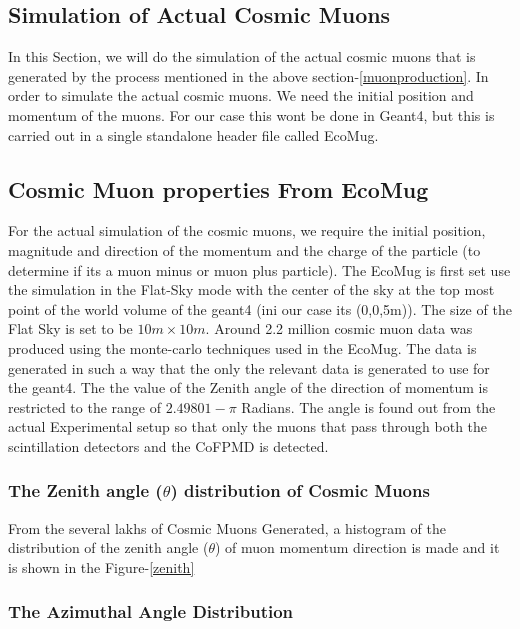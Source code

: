 \documentclass{article}
\begin{document}
\begin{multicols}{2}
\section{Simulation of Actual Cosmic Muons}

In this Section, we will do the simulation of the actual cosmic muons that is generated
by the process mentioned in the above section-\ref{muonproduction}. In order to 
simulate the actual cosmic muons. We need the initial position and momentum of the
muons. For our case this wont be done in Geant4, but this is carried out in a 
single standalone header file called EcoMug.


\subsection{Cosmic Muon properties From EcoMug}

For the actual simulation of the cosmic muons, we require the initial position,
magnitude and direction of the momentum and the charge of the particle (to determine if 
its a muon minus or muon plus particle). The EcoMug is first set use the
simulation in the Flat-Sky mode with the center of the sky at the top
most point of the world volume of the geant4 (ini our case its (0,0,5m)).
The size of the Flat Sky is set to be $10m \times 10m $. Around 2.2 million
cosmic muon data was produced using the monte-carlo techniques used in the 
EcoMug. The data is generated in such a way that the only the relevant 
data is generated to use for the geant4. The the value of the Zenith angle of
the direction of momentum is restricted to the range of $2.49801-\pi$ Radians.
The angle is found out from the actual Experimental setup so that only the muons
that pass through both the scintillation detectors and the CoFPMD is detected. 




\subsubsection{The Zenith angle (\texorpdfstring{$\theta$}{theta}) distribution of Cosmic Muons}

From the several lakhs of Cosmic Muons Generated, a histogram of the
distribution of the zenith angle ($\theta$) of muon momentum direction is made and it is shown in the
Figure-\ref{zenith}




\subsubsection{The Azimuthal Angle Distribution}


\end{multicols}
\end{document}
